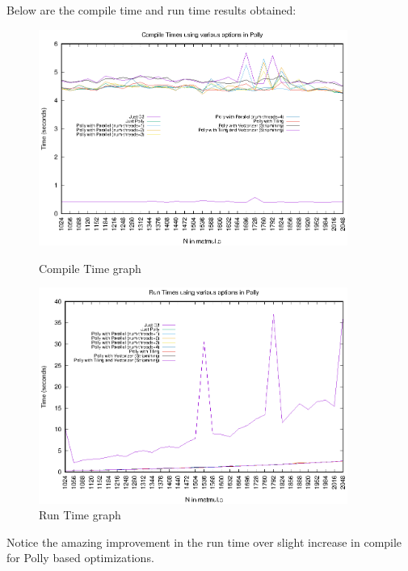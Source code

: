 \documentclass{article}
\begin{document}
\begin{flushleft}
Below are the compile time and run time results obtained:
\begin{figure}[H]
\begin{minipage}{0.45\linewidth}
\includegraphics[width=0.9\textwidth]{./images/compile_time.eps}
\caption{Compile Time graph}
\end{minipage}
\hfill
\begin{minipage}{0.45\linewidth}
\includegraphics[width=0.9\textwidth]{./images/run_time.eps}
\caption{Run Time graph}
\end{minipage}
\end{figure}

Notice the amazing improvement in the run time over slight increase in compile for Polly based optimizations.
\end{flushleft}
\end{document}
